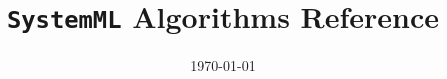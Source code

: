 \newcommand{\Paragraph}[1]{\vspace*{1ex} \noindent {\bf #1} \hspace*{1ex}}
\newenvironment{Itemize}{\vspace{-0.5ex}\begin{itemize}\setlength{\itemsep}{-0.2ex}
}{\end{itemize}\vspace{-0.5ex}}
\newenvironment{Enumerate}{\vspace{-0.5ex}\begin{enumerate}\setlength{\itemsep}{-0.2ex}
}{\end{enumerate}\vspace{-0.5ex}}
\newenvironment{Description}{\vspace{-0.5ex}\begin{description}\setlength{\itemsep}{-0.2ex}
}{\end{description}\vspace{-0.5ex}}


\newcommand{\SystemML}{\texttt{SystemML} }
\newcommand{\hml}{\texttt{hadoop jar SystemML.jar} }
\newcommand{\pxp}{\mathbin{\texttt{\%\textasteriskcentered\%}}}
\newcommand{\todo}[1]{{{\color{red}TODO: #1}}}
\newcommand{\Normal}{\ensuremath{\mathop{\mathrm{Normal}}\nolimits}}
\newcommand{\Prob}{\ensuremath{\mathop{\mathrm{Prob}\hspace{0.5pt}}\nolimits}}
\newcommand{\E}{\ensuremath{\mathop{\mathrm{E}}\nolimits}}
\newcommand{\mean}{\ensuremath{\mathop{\mathrm{mean}}\nolimits}}
\newcommand{\Var}{\ensuremath{\mathop{\mathrm{Var}}\nolimits}}
\newcommand{\Cov}{\ensuremath{\mathop{\mathrm{Cov}}\nolimits}}
\newcommand{\stdev}{\ensuremath{\mathop{\mathrm{st.dev}}\nolimits}}
\newcommand{\atan}{\ensuremath{\mathop{\mathrm{arctan}}\nolimits}}
\newcommand{\diag}{\ensuremath{\mathop{\mathrm{diag}}\nolimits}}
\newcommand{\const}{\ensuremath{\mathop{\mathrm{const}}\nolimits}}
\newcommand{\eps}{\varepsilon}

\sloppy


\title{\LARGE{{\SystemML Algorithms Reference}}} 
\date{\today}

	

\maketitle

